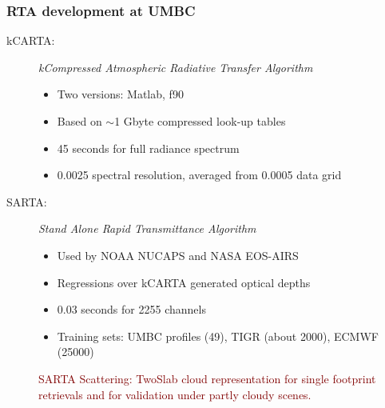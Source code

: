 \documentclass[10pt,t]{beamer}
\begin{document}
\begin{frame}[shrink=5]
  \frametitle{RTA development at UMBC}
  \vspace{0.125in} 
  \begin{description}
  \item[kCARTA:]

    \textit{kCompressed Atmospheric Radiative Transfer Algorithm}\\
    \begin{itemize}
    \item Two versions: Matlab, f90
    \item Based on $\sim$1 Gbyte compressed look-up tables
    \item 45 seconds for full radiance spectrum
    \item 0.0025 \wn spectral resolution, averaged from 0.0005 \wn data
      grid
    \end{itemize}

  \item [SARTA:] \emph{Stand Alone Rapid Transmittance Algorithm }\\
    \begin{itemize}
    \item Used by NOAA NUCAPS and NASA EOS-AIRS
    \item Regressions over kCARTA generated optical depths
    \item 0.03 seconds for 2255 channels
    \item Training sets: UMBC profiles (49), TIGR (about 2000), ECMWF
      (25000)
    \end{itemize}
    \textcolor{maroon}{SARTA Scattering: TwoSlab cloud representation for
      single footprint retrievals and for validation under partly cloudy
      scenes.}
  \end{description}
\end{frame}
\end{document}
